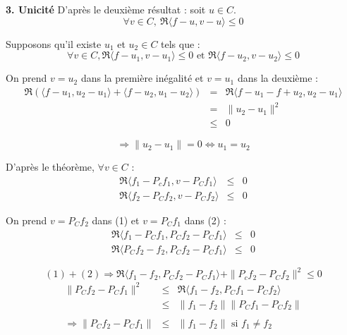 \begin{dem}
\bigskip
\textbf{3. Unicité}
D'après le deuxième résultat : soit $u\in C$. 
\[\forall v\in C,\ \Re \langle f-u, v-u\rangle \leq 0\]

Supposons qu'il existe $u_1$ et $u_2\in C$ tels que :
\[\forall v\in C, \Re \langle f-u_1, v-u_1\rangle \leq 0 \text{ et } \Re \langle f-u_2, v-u_2\rangle \leq 0\]

On prend $v=u_2$ dans la première inégalité et $v=u_1$ dans la deuxième :
\begin{eqnarray*}
	\Re (\langle f-u_1, u_2-u_1\rangle + \langle f-u_2, u_1-u_2\rangle)&=&\Re \langle f-u_1-f+u_2,u_2-u_1\rangle\\
									&=&\|u_2-u_1\|^2\\ 
									&\leq& 0
\end{eqnarray*}

\[\Rightarrow \|u_2-u_1\| = 0 \Leftrightarrow u_1=u_2\]
\end{dem}


\begin{dem}
D'après le théorème, $\forall v\in C$ :
\begin{eqnarray}
	\Re \langle f_1-P_cf_1, v-P_Cf_1\rangle &\leq& 0\\
	\Re \langle f_2-P_Cf_2,v-P_Cf_2\rangle &\leq& 0
\end{eqnarray}

On prend $v=P_Cf_2$ dans (1) et $v=P_Cf_1$ dans (2) :
\begin{eqnarray*}
	\Re \langle f_1-P_Cf_1, P_Cf_2-P_Cf_1\rangle &\leq& 0\\
	\Re \langle P_Cf_2-f_2, P_Cf_2-P_Cf_1\rangle &\leq& 0
\end{eqnarray*}

\[(1)+(2)\Rightarrow \Re \langle f_1-f_2,P_Cf_2-P_Cf_1\rangle + \|P_cf_2-P_Cf_2\|^2\leq 0\]
\begin{eqnarray*}
	\|P_Cf_2-P_Cf_1\|^2 &\leq& \Re \langle f_1-f_2, P_Cf_1-P_Cf_2\rangle \\
			&\leq&\|f_1-f_2\|\|P_Cf_1-P_Cf_2\|\\
	\\
	\Rightarrow \|P_Cf_2-P_Cf_1\|&\leq& \|f_1-f_2\| \text{ si } f_1\neq f_2
\end{eqnarray*}
\end{dem}


